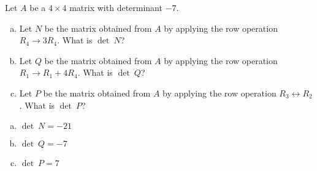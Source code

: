 
\begin{exerciseStatement}


Let \(A\) be a \(4 \times 4\) matrix with determinant \( -7 \).


\begin{enumerate}[(a)]
\item Let \(N\) be the matrix obtained from \(A\) by applying the row operation \( R_4 \to 3R_4 \). What is \(\operatorname{det}\ N\)?
\item Let \(Q\) be the matrix obtained from \(A\) by applying the row operation \( R_1 \to R_1 + 4R_4 \). What is \(\operatorname{det}\ Q\)?
\item Let \(P\) be the matrix obtained from \(A\) by applying the row operation \( R_3 \leftrightarrow R_2 \). What is \(\operatorname{det}\ P\)?
\end{enumerate}
    
\end{exerciseStatement}
    
\begin{exerciseAnswer} 

\begin{enumerate}[(a)]
\item \(\operatorname{det}\ N= -21 \)
\item \(\operatorname{det}\ Q= -7 \)
\item \(\operatorname{det}\ P= 7 \)
\end{enumerate}
    
\end{exerciseAnswer}
    
